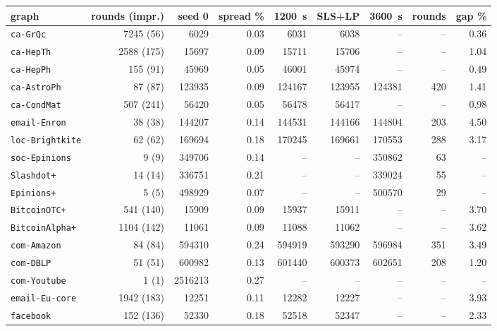 \begin{tabular}{lrrrrrrrr}
\toprule
graph & rounds (impr.) & seed 0 & spread \% & \SI{1200}{s} & SLS+LP & \SI{3600}{s} & rounds & gap \% \\
\midrule
\texttt{ca-GrQc} & 7245 (56) & \num{6029} & 0.03 & \num{6031} & \num{6038} & -- & -- & 0.36 \\
\texttt{ca-HepTh} & 2588 (175) & \num{15697} & 0.09 & \num{15711} & \num{15706} & -- & -- & 1.04 \\
\texttt{ca-HepPh} & 155 (91) & \num{45969} & 0.05 & \num{46001} & \num{45974} & -- & -- & 0.49 \\
\texttt{ca-AstroPh} & 87 (87) & \num{123935} & 0.09 & \num{124167} & \num{123955} & \num{124381} & 420 & 1.41 \\
\texttt{ca-CondMat} & 507 (241) & \num{56420} & 0.05 & \num{56478} & \num{56417} & -- & -- & 0.98 \\
\texttt{email-Enron} & 38 (38) & \num{144207} & 0.14 & \num{144531} & \num{144166} & \num{144804} & 203 & 4.50 \\
\texttt{loc-Brightkite} & 62 (62) & \num{169694} & 0.18 & \num{170245} & \num{169661} & \num{170553} & 288 & 3.17 \\
\texttt{soc-Epinions} & 9 (9) & \num{349706} & 0.14 & -- & -- & \num{350862} & 63 & -- \\
\texttt{Slashdot+} & 14 (14) & \num{336751} & 0.21 & -- & -- & \num{339024} & 55 & -- \\
\texttt{Epinions+} & 5 (5) & \num{498929} & 0.07 & -- & -- & \num{500570} & 29 & -- \\
\texttt{BitcoinOTC+} & 541 (140) & \num{15909} & 0.09 & \num{15937} & \num{15911} & -- & -- & 3.70 \\
\texttt{BitcoinAlpha+} & 1104 (142) & \num{11061} & 0.09 & \num{11088} & \num{11062} & -- & -- & 3.62 \\
\texttt{com-Amazon} & 84 (84) & \num{594310} & 0.24 & \num{594919} & \num{593290} & \num{596984} & 351 & 3.49 \\
\texttt{com-DBLP} & 51 (51) & \num{600982} & 0.13 & \num{601440} & \num{600373} & \num{602651} & 208 & 1.20 \\
\texttt{com-Youtube} & 1 (1) & \num{2516213} & 0.27 & -- & -- & -- & -- & -- \\
\texttt{email-Eu-core} & 1942 (183) & \num{12251} & 0.11 & \num{12282} & \num{12227} & -- & -- & 3.93 \\
\texttt{facebook} & 152 (136) & \num{52330} & 0.18 & \num{52518} & \num{52347} & -- & -- & 2.33 \\

\end{tabular}

